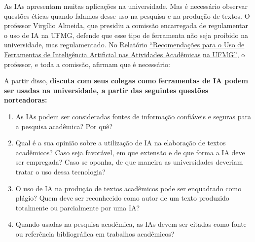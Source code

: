 \documentclass[portuguese]{textolivre}
\begin{document}
\begin{tcolorbox}
As IAs apresentam muitas aplicações na universidade. Mas é necessário observar questões éticas quando falamos desse uso na pesquisa e na produção de textos. O professor Virgílio Almeida, que presidiu a comissão encarregada de regulamentar o uso de IA na UFMG, defende que esse tipo de ferramenta não seja proibido na universidade, mas regulamentado. No Relatório \underline{``Recomendações para o Uso de Ferramentas de Inteligência Artificial nas Atividades Acadêmicas} \underline{na UFMG''}, o professor, e toda a comissão, afirmam que é necessário:
\medskip
{}
\bigskip
A partir disso, \textbf{discuta com seus colegas como ferramentas de IA podem ser usadas na universidade, a partir das seguintes questões norteadoras:}
\medskip
\begin{enumerate}
    \item As IAs podem ser consideradas fontes de informação confiáveis e seguras para a pesquisa acadêmica? Por quê?
\item Qual é a sua opinião sobre a utilização de IA na elaboração de textos acadêmicos? Caso seja favorável, em que extensão e de que forma a IA deve ser empregada? Caso se oponha, de que maneira as universidades deveriam tratar o uso dessa tecnologia?
\item O uso de IA na produção de textos acadêmicos pode ser enquadrado como plágio? Quem deve ser reconhecido como autor de um texto produzido totalmente ou parcialmente por uma IA?
\item Quando usadas na pesquisa acadêmica, as IAs devem ser citadas como fonte ou referência bibliográfica em trabalhos acadêmicos?
\end{enumerate}
\end{tcolorbox}
\end{document}
